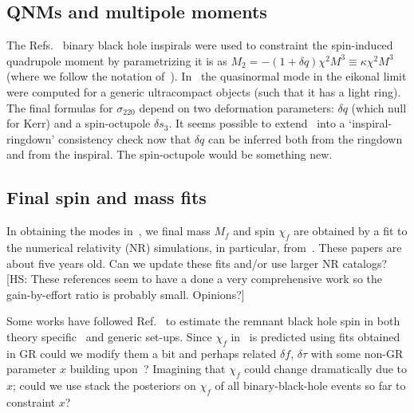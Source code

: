 \documentclass[aps,10pt,preprint,
               notitlepage,onecolumn,superscriptaddress,
               eqsecnum,
               nofootinbib,tightenlines,floatfix]{revtex4-1}
\newcommand{\hs}[1]{{\color{magenta}[HS: #1]}}
\begin{document}

\subsection{QNMs and multipole moments}
%
The Refs.~\cite{Krishnendu:2017shb,Krishnendu:2019tjp} binary black hole
inspirals were used to constraint the spin-induced quadrupole moment by
parametrizing it is as $M_2 = - (1 + \delta q) \chi^2 M^3 \equiv \kappa \chi^2 M^3$ (where we follow the
notation of~\cite{Glampedakis:2017cgd}).
%
In~\cite{Glampedakis:2017cgd} the quasinormal mode in the eikonal limit were computed
for a generic ultracompact objects (such that it has a light ring).
%
The final formulas for $\sigma_{220}$ depend on two deformation parameters:
$\delta q$ (which null for Kerr) and a spin-octupole $\delta s_{3}$.
%
It seems possible to extend~\cite{Krishnendu:2017shb,Krishnendu:2019tjp}
into a `inspiral-ringdown' consistency check now that $\delta q$ can be inferred
both from the ringdown and from the inspiral. The spin-octupole would be something new.


\subsection{Final spin and mass fits}
%
In obtaining the modes in~\cite{Ghosh:2021mrv}, we final mass $M_f$ and spin
$\chi_f$ are obtained by a fit to the numerical relativity (NR) simulations, in
particular, from~\cite{Taracchini:2013rva,Hofmann:2016yih}.
%
These papers are about five years old. Can we update these fits and/or use
larger NR catalogs?
%
\hs{These references seem to have a done a very comprehensive work so the
gain-by-effort ratio is probably small. Opinions?}

Some works have followed Ref.~\cite{Buonanno:2007sv} to estimate the remnant black hole spin
in both theory specific~\cite{Jai-akson:2017ldo} and generic set-ups.
%
Since $\chi_f$ in~\cite{Ghosh:2021mrv} is predicted using fits obtained in GR
could we modify them a bit and perhaps related $\delta f$, $\delta \tau$ with
some non-GR parameter $x$ building upon~\cite{Buonanno:2007sv}?
%
Imagining that $\chi_f$ could change dramatically due to $x$;
could we use stack the posteriors on $\chi_f$ of all binary-black-hole events so far
to constraint $x$?
\end{document}
